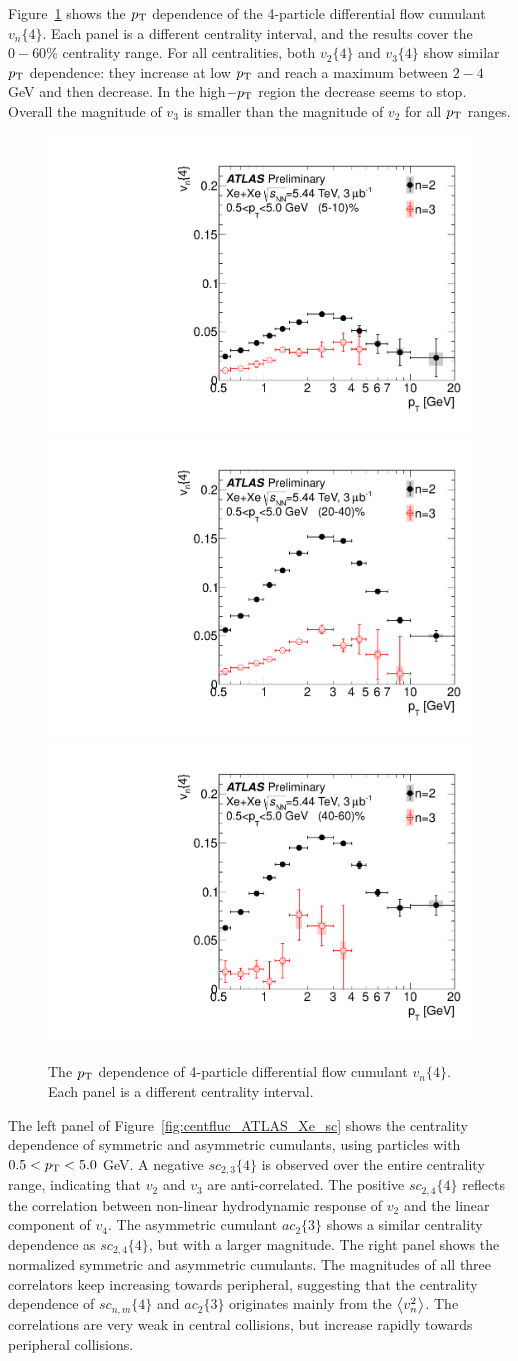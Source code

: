 Figure~\ref{fig:centfluc_ATLAS_Xe_vn_diff} shows the $p_\text{T}$ dependence of the 4-particle differential flow cumulant $v_n\{4\}$. Each panel is a different centrality interval, and the results cover the $0-60\%$ centrality range. For all centralities, both $v_2\{4\}$ and $v_3\{4\}$ show similar $p_\text{T}$ dependence: they increase at low $p_\text{T}$ and reach a maximum between $2-4$ GeV and then decrease. In the high$-p_\text{T}$ region the decrease seems to stop. Overall the magnitude of $v_3$ is smaller than the magnitude of $v_2$ for all $p_\text{T}$ ranges.

\begin{figure}[H]
\centering
\includegraphics[width=.32\linewidth]{figs/chapter_centfluc/ATLAS_Xe_vn_diff_cent1.pdf}
\includegraphics[width=.32\linewidth]{figs/chapter_centfluc/ATLAS_Xe_vn_diff_cent2.pdf}
\includegraphics[width=.32\linewidth]{figs/chapter_centfluc/ATLAS_Xe_vn_diff_cent3.pdf}
\caption{The $p_\text{T}$ dependence of 4-particle differential flow cumulant $v_n\{4\}$. Each panel is a different centrality interval.}
\label{fig:centfluc_ATLAS_Xe_vn_diff}
\end{figure}

The left panel of Figure~\ref{fig:centfluc_ATLAS_Xe_sc} shows the centrality dependence of symmetric and asymmetric cumulants, using particles with $0.5<p_\text{T}<5.0$ GeV. A negative $sc_{2,3}\{4\}$ is observed over the entire centrality range, indicating that $v_2$ and $v_3$ are anti-correlated. The positive $sc_{2,4}\{4\}$ reflects the correlation between non-linear hydrodynamic response of $v_2$ and the linear component of $v_4$. The asymmetric cumulant $ac_{2}\{3\}$ shows a similar centrality dependence as $sc_{2,4}\{4\}$, but with a larger magnitude. The right panel shows the normalized symmetric and asymmetric cumulants. The magnitudes of all three correlators keep increasing towards peripheral, suggesting that the centrality dependence of $sc_{n,m}\{4\}$ and $ac_2\{3\}$ originates mainly from the $\left\langle v_n^2\right\rangle$. The correlations are very weak in central collisions, but increase rapidly towards peripheral collisions.

